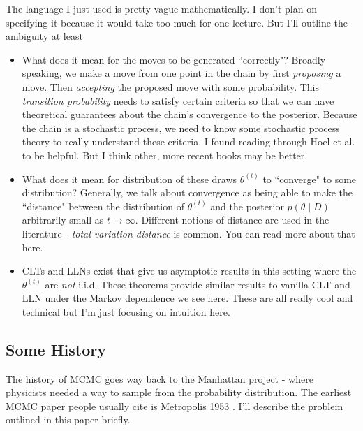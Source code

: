 \documentclass[twoside]{article}
\begin{document}
The language I just used is pretty vague mathematically. I don't plan on specifying it because it would take too much for one lecture. But I'll outline the ambiguity at least
\begin{itemize}
	\item What does it mean for the moves to be generated ``correctly"? Broadly speaking, we make a move from one point in the chain by first \textit{proposing} a move. Then \textit{accepting} the proposed move with some probability. This \textit{transition probability} needs to satisfy certain criteria so that we can have theoretical guarantees about the chain's convergence to the posterior. Because the chain is a stochastic process, we need to know some stochastic process theory to really understand these criteria. I found reading through Hoel et al. \citep{hoel1986} to be helpful. But I think other, more recent books may be better.
	\item What does it mean for distribution of these draws $\theta^{(t)}$ to ``converge" to some distribution? Generally, we talk about convergence as being able to make the ``distance" between the distribution of $\theta^{(t)}$ and the posterior $p(\theta \mid D)$ arbitrarily small as $t\rightarrow \infty$. Different notions of distance are used in the literature - \textit{total variation distance} is common. You can read more about that here. 
	\item CLTs and LLNs exist that give us asymptotic results in this setting where the $\theta^{(t)}$ are \textit{not} i.i.d. These theorems provide similar results to vanilla CLT and LLN under the Markov dependence we see here. These are all really cool and technical but I'm just focusing on intuition here.
\end{itemize}

\subsection{Some History}

The history of MCMC goes way back to the Manhattan project - where physicists needed a way to sample from the probability distribution. The earliest MCMC paper people usually cite is Metropolis 1953 \citep{Metropolis1953}. I'll describe the problem outlined in this paper briefly. \\
\end{document}
